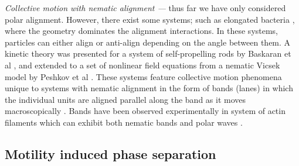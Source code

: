 

\textit{Collective motion with nematic alignment ---} thus far we have only considered polar alignment. However, there exist some systems; such as elongated bacteria \cite{peruani2012}, where the geometry dominates the alignment interactions. In these systems, particles can either align or anti-align depending on the angle between them. A kinetic theory was presented for a system of self-propelling rods by Baskaran et al \cite{baskaran2008}, and extended to a set of nonlinear field equations from a nematic Vicsek model by Peshkov et al \cite{peshkov2012}. These systems feature collective motion phenomena unique to systems with nematic alignment in the form of bands (lanes) in which the individual units are aligned parallel along the band as it moves macroscopically \cite{chate2006,ginelli2010}. Bands have been observed experimentally in system of actin filaments which can exhibit both nematic bands and polar waves \cite{huber2018}.

  

\subsection{Motility induced phase separation}

